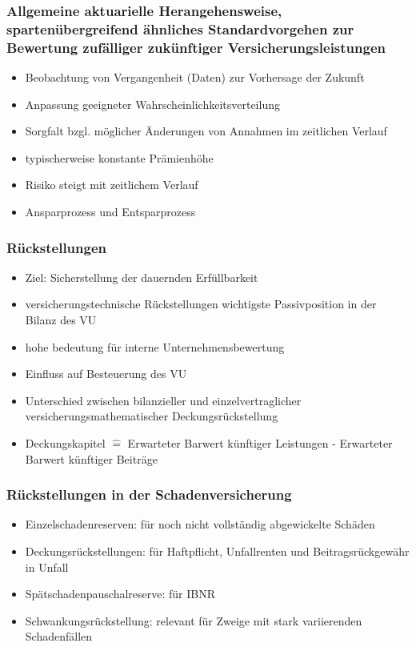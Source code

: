 \documentclass[12pt]{report}
\theoremstyle{dotless}
\theoremstyle{definition}
\begin{document}
\subsubsection{Allgemeine aktuarielle Herangehensweise, spartenübergreifend ähnliches Standardvorgehen zur Bewertung zufälliger zukünftiger Versicherungsleistungen}
\begin{itemize}
	\item Beobachtung von Vergangenheit (Daten) zur Vorhersage der Zukunft
	\item Anpassung geeigneter Wahrscheinlichkeitsverteilung
	\item Sorgfalt bzgl. möglicher Änderungen von Annahmen im zeitlichen Verlauf
	\item typischerweise konstante Prämienhöhe
	\item Risiko steigt mit zeitlichem Verlauf
	\item Ansparprozess und Entsparprozess
\end{itemize}

\subsubsection{Rückstellungen}
\begin{itemize}
	\item Ziel: Sicherstellung der dauernden Erfüllbarkeit
	\item versicherungstechnische Rückstellungen wichtigste Passivposition in der Bilanz des VU
	\item hohe bedeutung für interne Unternehmensbewertung
	\item Einfluss auf Besteuerung des VU
	\item Unterschied zwischen bilanzieller und einzelvertraglicher versicherungsmathematischer Deckungsrückstellung
	\item Deckungskapitel $\hat{=}$ Erwarteter Barwert künftiger Leistungen - Erwarteter Barwert künftiger Beiträge
\end{itemize}

\subsubsection{Rückstellungen in der Schadenversicherung}
\begin{itemize}
	\item Einzelschadenreserven: für noch nicht vollständig abgewickelte Schäden
	\item Deckungsrückstellungen: für Haftpflicht, Unfallrenten und Beitragsrückgewähr in Unfall
	\item Spätschadenpauschalreserve: für IBNR
	\item Schwankungsrückstellung: relevant für Zweige mit stark variierenden Schadenfällen 
\end{itemize}
\end{document}
